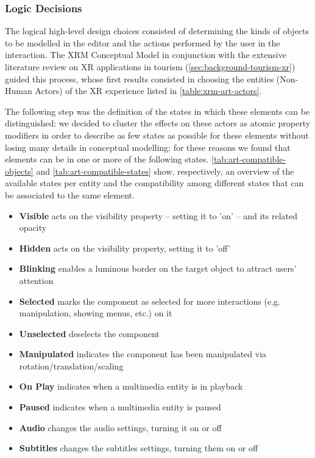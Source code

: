 \subsubsection*{Logic Decisions}
The logical high-level design choices consisted of determining the kinds of objects to be modelled in the editor and the actions performed by the user in the interaction. The XRM Conceptual Model in conjunction with the extensive literature review on XR applications in tourism (\autoref{sec:background-tourism-xr}) guided this process, whose first results consisted in choosing the entities (Non-Human Actors) of the XR experience listed in \autoref{table:xrm-art-actors}.

The following step was the definition of the states in which these elements can be distinguished: we decided to cluster the effects on these actors as atomic property modifiers in order to describe as few states as possible for these elements without losing many details in conceptual modelling; for these reasons we found that elements can be in one or more of the following states. \autoref{tab:art-compatible-objects} and \autoref{tab:art-compatible-states} show, respectively, an overview of the available states per entity and the compatibility among different states that can be associated to the same element.

\begin{itemize}
    \item \textbf{Visible} acts on the visibility property -- setting it to 'on' -- and its related opacity
    \item \textbf{Hidden} acts on the visibility property, setting it to 'off'
    \item \textbf{Blinking} enables a luminous border on the target object to attract users' attention
    \item \textbf{Selected} marks the component as selected for more interactions (e.g. manipulation, showing menus, etc.) on it
    \item \textbf{Unselected} deselects the component
    \item \textbf{Manipulated} indicates the component has been manipulated via rotation/translation/scaling
    \item \textbf{On Play} indicates when a multimedia entity is in playback
    \item \textbf{Paused} indicates when a multimedia entity is paused
    \item \textbf{Audio} changes the audio settings, turning it on or off
    \item \textbf{Subtitles} changes the subtitles settings, turning them on or off
\end{itemize}

